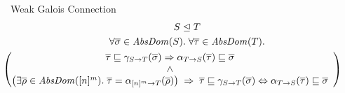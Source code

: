 \documentclass[11pt,svgnames,smaller,aspectratio=43,english]{beamer}
\renewcommand{\implies}{\Rightarrow}
\renewcommand{\iff}{\Leftrightarrow}
\begin{document}
\begin{frame}{Weak Galois Connection}
	\begin{gather*}
		S \trianglelefteq T\\
		\forall \overline{\sigma}\in \mathit{AbsDom}(S).\; \forall \overline{\tau}\in \mathit{AbsDom}(T).\\
		\hspace*{-3em}
		\left(\begin{array}{@{}cc@{}@{}}
			\overline{\tau}\sqsubseteq \gamma_{S \rightarrow T}(\overline{\sigma}) \implies \alpha_{T\rightarrow S}(\overline{\tau})\sqsubseteq \overline{\sigma} \\
			\land\\
			\left(\exists \overline{\rho}\in\mathit{AbsDom}([n]^m).\;\overline{\tau} = \alpha_{[n]^m\rightarrow T}(\overline{\rho})\right) \;\implies\; \overline{\tau}\sqsubseteq \gamma_{S\rightarrow T}(\overline{\sigma}) \iff \alpha_{T\rightarrow S}(\overline{\tau}) \sqsubseteq \overline{\sigma} 
		  \end{array}\right)
	\end{gather*}
\end{frame}

\dospots
\addtocounter{framenumber}{-5}



\end{document}
